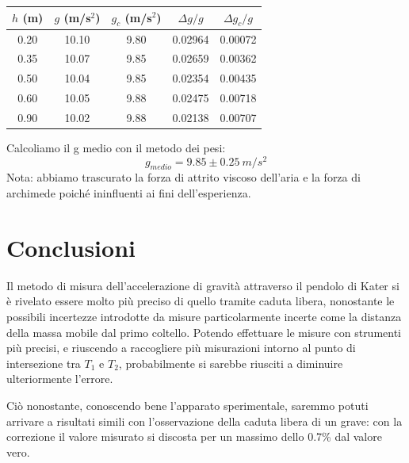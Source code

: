 \begin{center}
\begin{tabular}{c|c|c|c|c}
$h$ (m) & $g$ (m/s$^2$) & $g_c$ (m/s$^2$) & $\Delta g/g$ & $\Delta g_c/g$\\
\midrule
0.20 & 10.10 & 9.80 & 0.02964 & 0.00072 \\
0.35 & 10.07 & 9.85 & 0.02659 & 0.00362 \\
0.50 & 10.04 & 9.85 & 0.02354 & 0.00435 \\
0.60 & 10.05 & 9.88 & 0.02475 & 0.00718 \\
0.90 & 10.02 & 9.88 & 0.02138 & 0.00707 \\
\end{tabular}
\end{center}
Calcoliamo il g medio con il metodo dei pesi: 
$$ g_{medio} = 9.85 \pm 0.25 \ m/s^2  $$
Nota: abbiamo trascurato la forza di attrito viscoso dell'aria e la forza di archimede poiché ininfluenti ai fini dell'esperienza.

\section{Conclusioni}

Il metodo di misura dell'accelerazione di gravità attraverso il pendolo di Kater si è rivelato essere molto più preciso di quello tramite caduta libera, nonostante le possibili incertezze introdotte da misure particolarmente incerte come la distanza della massa mobile dal primo coltello. Potendo effettuare le misure con strumenti più precisi, e riuscendo a raccogliere più misurazioni intorno al punto di intersezione tra $T_1$ e $T_2$, probabilmente si sarebbe riusciti a diminuire ulteriormente l'errore. 

Ciò nonostante, conoscendo bene l'apparato sperimentale, saremmo potuti arrivare a risultati simili con l'osservazione della caduta libera di un grave: con la correzione il valore misurato si discosta per un massimo dello 0.7\% dal valore vero.

